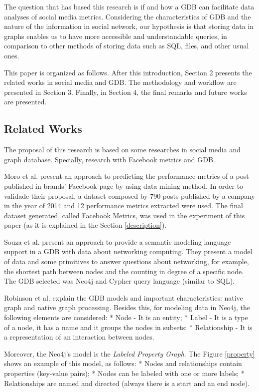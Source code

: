 The question that has based this research is if and how a GDB can
facilitate data analyses of social media metrics. Considering the
characteristics of GDB and the nature of the information in social
network, our hypothesis is that storing data in graphs enables us to
have more accessible and understandable queries, in comparison to other
methods of storing data such as SQL, files, and other usual ones.

This paper is organized as follows. After this introduction, Section 2
presents the related works in social media and GDB. The methodology and
workflow are presented in Section 3. Finally, in Section 4, the final
remarks and future works are presented.

\subsection{Related Works}\label{related-works}

The proposal of this research is based on some researches in social
media and graph database. Specially, research with Facebook metrics and
GDB.

Moro et al. \cite{social} present an approach to predicting the
performance metrics of a post published in brands' Facebook page by
using data mining method. In order to validade their proposal, a dataset
composed by 790 posts published by a company in the year of 2014 and 12
performance metrics extracted were used. The final dataset generated,
called Facebook Metrics, was used in the experiment of this paper (as it
is explained in the Section \ref{description}).

Souza et al. \cite{ewsdn} present an approach to provide a semantic
modeling language support in a GDB with data about networking computing.
They present a model of data and some primitives to answer questions
about networking, for example, the shortest path between nodes and the
counting in degree of a specific node. The GDB selected was Neo4j and
Cypher query language (similar to SQL).

Robinson et al. \cite{graphDB} explain the GDB models and important
characteristics: native graph and native graph processing. Besides this,
for modeling data in Neo4j, the following elements are considered: *
Node - It is an entity; * Label - It is a type of a node, it has a name
and it groups the nodes in subsets; * Relationship - It is a
representation of an interaction between nodes.

Moreover, the Neo4j's model is the \emph{Labeled Property Graph}. The
Figure \ref{property} shows an example of this model, as follows: *
Nodes and relationships contain properties (key-value pairs); * Nodes
can be labeled with one or more labels; * Relationships are named and
directed (always there is a start and an end node).

